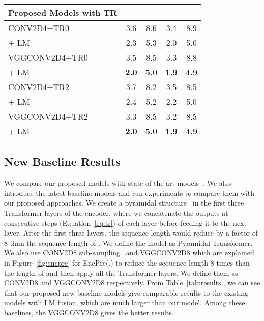 \documentclass{article}
\begin{document}
\begin{table*}[ht]
\begin{center}
\begin{small}
\begin{sc}
\begin{tabular}{lcccc}
\hline
    Proposed Models with TR &&&& \\ \hline
    CONV2D4+TR0  &3.6 & 8.6 &3.4  & 8.9 \\
    \hspace{0.5cm}   + LM &2.3 &5.3 &2.0 &5.0\\
    VGGCONV2D4+TR0 & 3.5&8.5 & 3.3 & 8.8 \\
    \hspace{0.5cm}   + LM &\textbf{2.0} &\textbf{5.0} &\textbf{1.9} &\textbf{4.9}\\
    CONV2D4+TR2 &3.7 & 8.2 & 3.5 & 8.5 \\
    \hspace{0.5cm}   + LM &2.4 &5.2 &2.2 &5.0\\
    VGGCONV2D4+TR2 &3.3 & 8.5 & 3.2 & 8.5 \\
    \hspace{0.5cm}   + LM &\textbf{2.0} &\textbf{5.0} &\textbf{1.9} &\textbf{4.9}\\
\bottomrule
\end{tabular}
\end{sc}
\end{small}
\end{center}
\vskip -0.1in
\end{table*}

\subsection{New Baseline Results}
We compare our proposed models with  state-of-the-art models~\citep{moritz2020,specaugment,karita2019asru,wang2020a,wang2020b,rwth,e2e2020}. We also introduce the latest baseline models and run experiments to compare them with our proposed approaches. We create a pyramidal structure~\citep{chan2016listen} in the first three Transformer layers of the encoder, where we concatenate the outputs at consecutive steps (Equation~\ref{eq:tr}) of each layer before feeding it to the next layer. After the first three layers, the sequence length would reduce by a factor of 8 than the sequence length of . We define the model as Pyramidal Transformer. We also use CONV2D8 sub-sampling~\citep{espnet} and VGGCONV2D8 which are explained in Figure~\ref{fig:encpre} for EncPre(.) to reduce the sequence length 8 times than the length of  and then apply all the Transformer layers. We define them as  CONV2D8 and VGGCONV2D8 respectively. From Table~\ref{tab:results}, we can see that our proposed new baseline models give comparable results to the existing models with LM fusion, which are much larger than our model. Among these baselines, the VGGCONV2D8 gives the better results. 
\end{document}
